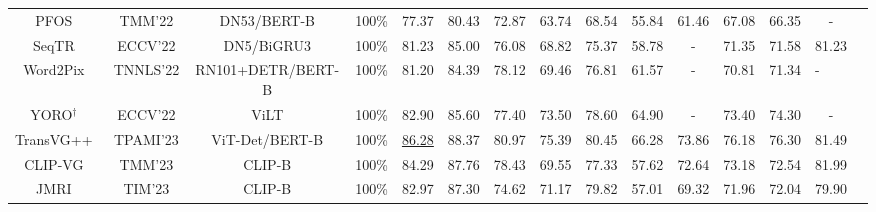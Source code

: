 \begin{table*}[!t]
{\begin{tabular}{lllccccccccccll}
\multicolumn{1}{c|}{PFOS~\cite{sun2022proposal}}   &\multicolumn{1}{c|}{TMM’22}& \multicolumn{1}{c|}{DN53/BERT-B}& \multicolumn{1}{c|}{100\%} & 77.37 & 80.43 & \multicolumn{1}{c|}{72.87} & 63.74 & 68.54 & \multicolumn{1}{c|}{55.84} & 61.46 & 67.08 & \multicolumn{1}{c|}{66.35}  &\multicolumn{1}{c}{-} &\\
\multicolumn{1}{c|}{SeqTR~\cite{zhu2022seqtr}}   & \multicolumn{1}{c|}{ECCV'22} &\multicolumn{1}{c|}{DN5/BiGRU3}& \multicolumn{1}{c|}{100\%}   & 81.23  & 85.00  & \multicolumn{1}{c|}{76.08}  & 68.82  & 75.37  & \multicolumn{1}{c|}{58.78} & - & 71.35  & \multicolumn{1}{c|}{71.58}    &\multicolumn{1}{c}{81.23} &\\  
\multicolumn{1}{c|}{Word2Pix~\cite{zhao2022word2pix}}     & \multicolumn{1}{c|}{TNNLS’22} &\multicolumn{1}{c|}{RN101+DETR/BERT-B}& \multicolumn{1}{c|}{100\%}   & 81.20  & 84.39  & \multicolumn{1}{c|}{78.12}  & 69.46  & 76.81  & \multicolumn{1}{c|}{61.57} & -& 70.81  & \multicolumn{1}{c|}{71.34}      &- &\\
\multicolumn{1}{c|}{YORO$^\dagger$~\cite{ho2023yoro}}   & \multicolumn{1}{c|}{ECCV'22} &\multicolumn{1}{c|}{ViLT}& \multicolumn{1}{c|}{100\%}  & 82.90  & 85.60  & \multicolumn{1}{c|}{77.40}  & 73.50  & 78.60  & \multicolumn{1}{c|}{64.90} & - & 73.40  & \multicolumn{1}{c|}{74.30}    &\multicolumn{1}{c}{-} &\\


     
\multicolumn{1}{c|}{TransVG++~\cite{transvg++}}  & \multicolumn{1}{c|}{TPAMI'23} &\multicolumn{1}{c|}{ViT-Det/BERT-B}& \multicolumn{1}{c|}{100\%} & \underline{86.28}  & 88.37  & \multicolumn{1}{c|}{80.97}  & 75.39  & 80.45  & \multicolumn{1}{c|}{66.28} &  73.86& 76.18  & \multicolumn{1}{c|}{76.30}  & \multicolumn{1}{c}{81.49}&\\ 

\multicolumn{1}{c|}{CLIP-VG~\cite{xiao2023clip}}  & \multicolumn{1}{c|}{TMM'23}& \multicolumn{1}{c|}{CLIP-B}& \multicolumn{1}{c|}{100\%}   & 84.29  & 87.76  & \multicolumn{1}{c|}{78.43}  & 69.55  & 77.33  & \multicolumn{1}{c|}{57.62} & 72.64 & 73.18  & \multicolumn{1}{c|}{72.54}  &\multicolumn{1}{c}{81.99} &\\ 

\multicolumn{1}{c|}{JMRI~\cite{zhu2023jmri}}  & \multicolumn{1}{c|}{TIM'23}& \multicolumn{1}{c|}{CLIP-B}& \multicolumn{1}{c|}{100\%}    & 82.97 & 87.30  & \multicolumn{1}{c|}{74.62}  & 71.17  & 79.82  & \multicolumn{1}{c|}{57.01} & 69.32  & 71.96  & \multicolumn{1}{c|}{72.04}   & \multicolumn{1}{c}{79.90}&\\


\end{tabular}}
\end{table*}
